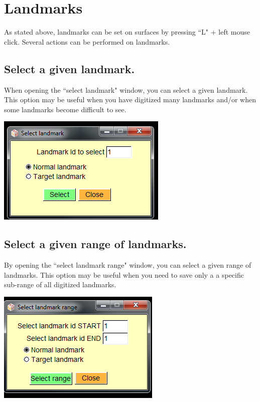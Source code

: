 
\chapter{Landmarks}\label{landmark_chapter}
\minitoc 


As stated above, landmarks can be set on surfaces by pressing ``L" + left mouse click. Several actions
can be performed on landmarks.

\section{Select a given landmark.}


\noindent
\begin{minipage}{0.5\textwidth}
When opening the ``select landmark" window, you can
select a given landmark. This option may be useful when
you have digitized many landmarks and/or when some
landmarks become difficult to see.
\end{minipage}    
\begin{minipage}{0.5\textwidth}\centering
  \includegraphics[scale=0.5]{images/Edit_selected_landmarks/Select_given_landmark.png}
 \end{minipage} 
\noindent

\section{Select a given range of landmarks.}
\noindent
\begin{minipage}{0.5\textwidth}
By opening the ``select landmark range" window, you can
select a given range of landmarks. This option may be useful
when you need to save only a a specific sub-range of all
digitized landmarks.
\end{minipage}    
\begin{minipage}{0.5\textwidth}\centering
  \includegraphics[scale=0.5]{images/Edit_selected_landmarks/Select_landmark_range.png}
 \end{minipage} 
\noindent




